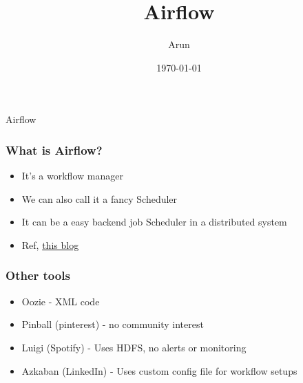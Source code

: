 \documentclass[12pt]{beamer}
\title{Airflow}
\author{Arun}
\date{\today}
\begin{document}
        \frame{\titlepage}
        \begin{frame}
            \begin{center}
                \huge{Airflow}
            \end{center}
        \end{frame}
    
        \begin{frame}
            \begin{center}
                \frametitle{What is Airflow?}
                \begin{itemize}
                    \pause
                    \item It's a workflow manager
                    \pause
                    \item We can also call it a fancy Scheduler
                    \pause
                    \item It can be a easy backend job Scheduler in a distributed system
                    \item Ref, \href{https://medium.com/@rako/apache-airflow-as-an-external-scheduler-for-distributed-systems-53b7354d3e48}{this blog}
                \end{itemize}
            \end{center}
        \end{frame}
    
        \begin{frame}
            \begin{center}
                \frametitle{Other tools}
                \begin{itemize}
                    \pause
                    \item Oozie - XML code
                    \pause
                    \item Pinball (pinterest) - no community interest
                    \pause
                    \item Luigi (Spotify) - Uses HDFS, no alerts or monitoring
                    \pause
                    \item Azkaban (LinkedIn) - Uses custom config file for workflow setups
                \end{itemize}
            \end{center}
        \end{frame}
    
\end{document}
